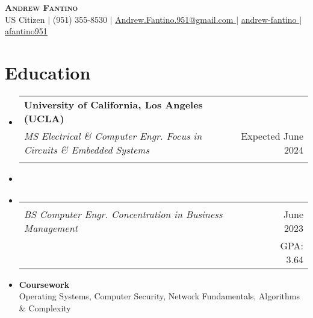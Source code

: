 \documentclass[letterpaper,11pt]{article}
\makeatletter
\newcommand{\resumeEducationSubheading}[4]{
  \vspace{-2pt}\item
    \begin{tabular*}{0.97\textwidth}[t]{l@{\extracolsep{\fill}}r}
      \textbf{#1} \\
      \textit{\small#3} & #2 \\
      & \small #4 \\
    \end{tabular*}\vspace{-7pt}
}
\newcommand{\resumeSubHeadingListStart}{\begin{itemize}[leftmargin=0.15in, label={}]}
\newcommand{\resumeSubHeadingListEnd}{\end{itemize}}
\makeatother
\begin{document}
\begin{center}
  \vspace{1.75em}
  \textbf{\Huge \scshape Andrew Fantino} \\ \vspace{3pt}
  \small US Citizen $|$
  \small {} (951) 355-8530 $|$ 
  \href{mailto:andrew.fantino.951@gmail.com}{  Andrew.Fantino.951@gmail.com } $|$ 
  \href{https://linkedin.com/in/andrew-fantino/}{  andrew-fantino } $|$
  \href{https://github.com/afantino951}{  afantino951} 
\end{center}

\section{Education}
  \resumeSubHeadingListStart
    \resumeEducationSubheading
      {University of California, Los Angeles (UCLA)}{Expected June 2024}
      {MS Electrical \& Computer Engr. Focus in Circuits \& Embedded Systems}{}
      \vspace{-53pt}\item

    \resumeEducationSubheading
      {}{June 2023}
      {BS Computer Engr. Concentration in Business Management}{GPA: 3.64}
      \vspace{-20pt}\item
      \textbf{Coursework} \\

        \small\quad Operating Systems, Computer Security, Network Fundamentals, Algorithms \& Complexity
        
        
    \vspace{-2pt}
  \resumeSubHeadingListEnd
\end{document}

